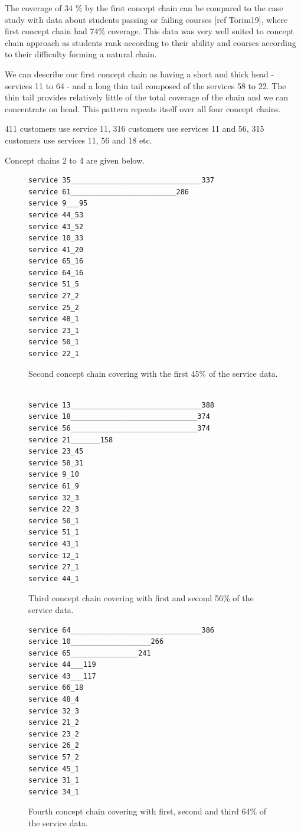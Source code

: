 \documentclass[acmconf,authordraft]{acmart}
\begin{document}
The coverage of 34 \% by the first concept chain can be compared to the case study with data about students passing or failing  courses [ref Torim19], where first concept chain had   74\% coverage. This data was very well suited to concept chain approach as students rank according to their ability and courses according to their difficulty forming a natural chain.

We can describe our first concept chain as having a short and thick head - services 11 to 64 - and a long thin tail composed of the services 58 to 22. The thin tail provides relatively little of the total coverage of the chain and we can concentrate on  head. This pattern repeats itself over all four concept chains.

411 customers use service 11, 316 customers use services 11 and 56, 315 customers use services 11, 56 and 18 etc.

Concept chains 2 to 4 are given below.


\begin{figure}[!htb]
\vspace{.5cm}
\begin{verbatim}
service 35_______________________________337
service 61_________________________286
service 9___95
service 44_53
service 43_52
service 10_33
service 41_20
service 65_16
service 64_16
service 51_5
service 27_2
service 25_2
service 48_1
service 23_1
service 50_1
service 22_1
\end{verbatim}

\caption{Second concept chain covering with the first 45\% of the service data.}
\label{fig:cc2}
\end{figure}

\begin{figure}[!htb]
\vspace{.5cm}
\begin{verbatim}

service 13_______________________________388
service 18______________________________374
service 56______________________________374
service 21_______158
service 23_45
service 58_31
service 9_10
service 61_9
service 32_3
service 22_3
service 50_1
service 51_1
service 43_1
service 12_1
service 27_1
service 44_1
\end{verbatim}

\caption{Third concept chain covering with first and second 56\% of the service data.}
\label{fig:cc3}
\end{figure}


\begin{figure}[!htb]
\vspace{.5cm}
\begin{verbatim}
service 64_______________________________386
service 10___________________266
service 65________________241
service 44___119
service 43___117
service 66_18
service 48_4
service 32_3
service 21_2
service 23_2
service 26_2
service 57_2
service 45_1
service 31_1
service 34_1
\end{verbatim}

\caption{Fourth concept chain covering with first, second and third 64\% of the service data.}
\label{fig:cc4}
\end{figure}
\end{document}
